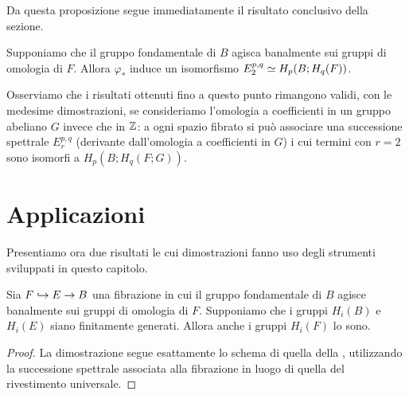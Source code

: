 Da questa proposizione segue immediatamente il risultato conclusivo della sezione.
\begin{proposition}
Supponiamo che il gruppo fondamentale di $B$ agisca banalmente sui gruppi di omologia di $F$. Allora $\varphi_*$ induce un isomorfismo $E^{p,q}_2\simeq H_p(B;H_q(F))$.
\end{proposition}

Osserviamo che i risultati ottenuti fino a questo punto rimangono validi, con le medesime dimostrazioni, se consideriamo l'omologia a coefficienti in un gruppo abeliano $G$ invece che in $\mathbb{Z}$: a ogni spazio fibrato si può associare una successione spettrale $E^{p,q}_r$ (derivante dall'omologia a coefficienti in $G$) i cui termini con $r=2$ sono isomorfi a $H_p(B;H_q(F;G))$.

\section{Applicazioni}
Presentiamo ora due risultati le cui dimostrazioni fanno uso degli strumenti sviluppati in questo capitolo.

\begin{proposition}
Sia $F\hookrightarrow E\to B$ una fibrazione in cui il gruppo fondamentale di $B$ agisce banalmente sui gruppi di omologia di $F$. Supponiamo che i gruppi $H_i(B)$ e $H_i(E)$ siano finitamente generati. Allora anche i gruppi $H_i(F)$ lo sono.
\end{proposition}
\begin{proof}
La dimostrazione segue esattamente lo schema di quella della , utilizzando la successione spettrale associata alla fibrazione in luogo di quella del rivestimento universale.
\end{proof}

